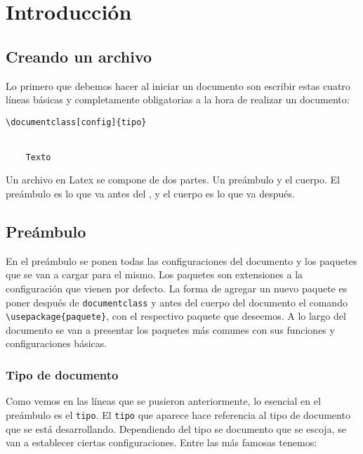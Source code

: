 	\section{Introducción}
	
	\subsection{Creando un archivo}
	
	Lo primero que debemos hacer al iniciar un documento son escribir estas cuatro líneas básicas y completamente obligatorias a la hora de realizar un documento:
	
	\begin{myquote}
		\begin{lstlisting}
\documentclass[config]{tipo}


	Texto

		\end{lstlisting}
	\end{myquote}
		
	Un archivo en Latex se compone de dos partes. Un preámbulo y el cuerpo. El preámbulo es lo que va antes del \verb||, y el cuerpo es lo que va después.
	
	\subsection{Preámbulo}
	
	En el preámbulo se ponen todas las configuraciones del documento y los paquetes que se van a cargar para el mismo. Los paquetes son extensiones a la configuración que vienen por defecto. La forma de agregar un nuevo paquete es poner después de \texttt{documentclass} y antes del cuerpo del documento el comando \verb|\usepackage{paquete}|, con el respectivo paquete que deseemos. A lo largo del documento se van a presentar los paquetes más comunes con sus funciones y configuraciones básicas.
	
	\subsubsection{Tipo de documento}
	
	Como vemos en las líneas que se pusieron anteriormente, lo esencial en el preámbulo es el \verb|tipo|. El \verb|tipo| que aparece hace referencia al tipo de documento que se está desarrollando. Dependiendo del tipo se documento que se escoja, se van a establecer ciertas configuraciones. Entre las más famosas tenemos:
	

